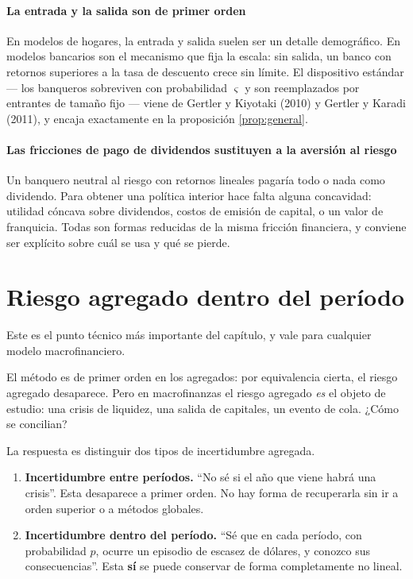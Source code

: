 \paragraph{La entrada y la salida son de primer orden} En modelos de hogares, la
entrada y salida suelen ser un detalle demográfico. En modelos bancarios son el
mecanismo que fija la escala: sin salida, un banco con retornos superiores a la
tasa de descuento crece sin límite. El dispositivo estándar --- los banqueros
sobreviven con probabilidad $\varsigma$ y son reemplazados por entrantes de
tamaño fijo --- viene de Gertler y Kiyotaki (2010) y Gertler y Karadi (2011), y
encaja exactamente en la proposición \ref{prop:general}.

\paragraph{Las fricciones de pago de dividendos sustituyen a la aversión al
riesgo} Un banquero neutral al riesgo con retornos lineales pagaría todo o nada
como dividendo. Para obtener una política interior hace falta alguna
concavidad: utilidad cóncava sobre dividendos, costos de emisión de capital, o
un valor de franquicia. Todas son formas reducidas de la misma fricción
financiera, y conviene ser explícito sobre cuál se usa y qué se pierde.

\section{Riesgo agregado dentro del período}

Este es el punto técnico más importante del capítulo, y vale para cualquier
modelo macrofinanciero.

El método es de primer orden en los agregados: por equivalencia cierta, el riesgo
agregado desaparece. Pero en macrofinanzas el riesgo agregado \emph{es} el
objeto de estudio: una crisis de liquidez, una salida de capitales, un evento de
cola. ¿Cómo se concilian?

La respuesta es distinguir dos tipos de incertidumbre agregada.

\begin{enumerate}[leftmargin=1.4em]
\item \textbf{Incertidumbre entre períodos.} ``No sé si el año que viene habrá
una crisis''. Esta desaparece a primer orden. No hay forma de recuperarla sin ir
a orden superior o a métodos globales.
\item \textbf{Incertidumbre dentro del período.} ``Sé que en cada período, con
probabilidad $p$, ocurre un episodio de escasez de dólares, y conozco sus
consecuencias''. Esta \textbf{sí} se puede conservar de forma completamente no
lineal.
\end{enumerate}

